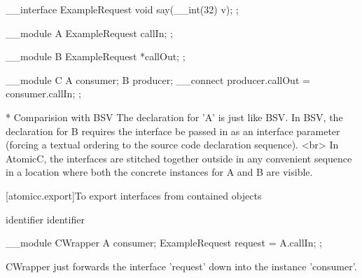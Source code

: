 \begin{example}
\begin{codeblock}
     __interface ExampleRequest {
         void say(__int(32) v);
     };

     __module A {
          ExampleRequest callIn;
     };

     __module B {
         ExampleRequest *callOut;
     };

     __module C {
         A consumer;
         B producer;
         __connect producer.callOut = consumer.callIn;
     };
\end{codeblock}
\end{example}

* Comparision with BSV
    The declaration for 'A' is just like BSV.
    In BSV, the declaration for B requires the interface be passed in as
    an interface parameter (forcing a textual ordering to the source code
    declaration sequence).
    <br>
    In AtomicC, the interfaces are stitched together outside in any
    convenient sequence in a location where both the concrete instances
    for A and B are visible.

[atomicc.export]{To export interfaces from contained objects}

\begin{bnf}
\br
     identifier \terminal{=} identifier \terminal{;}
\end{bnf}

\begin{example}
\begin{codeblock}
     __module CWrapper {
         A consumer;
         ExampleRequest request = A.callIn;
      };
\end{codeblock}
\end{example}

CWrapper just forwards the interface 'request' down into the instance 'consumer'.
